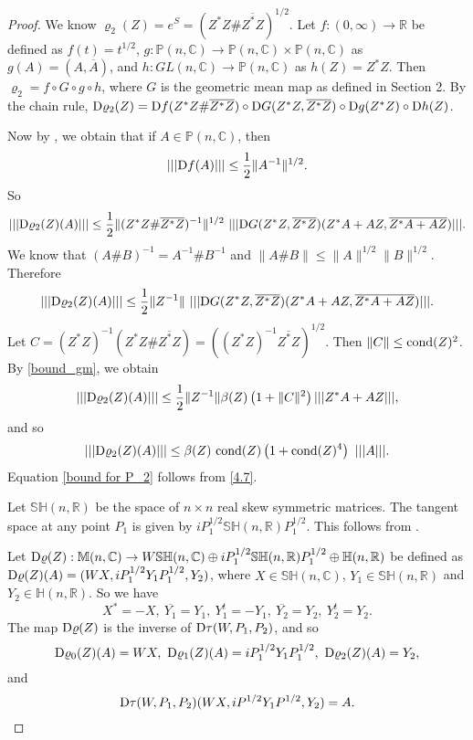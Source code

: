 \documentclass[12pt,epsfig,reqno]{amsart}
\newcommand{\C}{\mathbb{C}}
\newcommand{\R}{\mathbb{R}}
\newcommand{\De}{{\rm D}}
\theoremstyle{remark}
\begin{document}
\begin{proof}


We know $\varrho_2(Z)=e^S=(Z^*Z\# \overline{Z^*Z})^{1/2}$.
Let $f:(0,\infty)\rightarrow \mathbb R$ be defined as $f (t)=t^{1/2}$, $g:\mathbb P(n,\mathbb C)\rightarrow \mathbb P(n,\mathbb C)\times \mathbb P(n,\mathbb C)$ as $g(A)=(A,\overline{A})$, and $h:GL(n,\mathbb C)\rightarrow \mathbb P(n,\mathbb C)$ as $h(Z)=Z^*Z$. Then $\varrho_2=f\circ G \circ g \circ h$, where $G$ is the geometric mean map as defined in Section 2. By the chain rule, $\De \varrho_2(Z)=\De f(Z^*Z\#\overline{Z^*Z})\circ \De G(Z^*Z, \overline{Z^*Z})\circ \De g(Z^*Z)\circ \De h(Z)$.

Now by \cite[Theorem X.3.1]{bhatia_matrix_analysis}, we obtain that if $A\in \mathbb P(n,\mathbb C)$, then
\begin{equation}
|||\De f(A)|||\leq \frac{1}{2}\|A^{-1}\|^{1/2}.\label{6.5}
\end{equation}
So
 $$|||\De \varrho_2(Z)(A)|||\leq \frac{1}{2}\|(Z^*Z\#\overline{Z^*Z})^{-1}\|^{1/2}\ |||\De G(Z^*Z, \overline{Z^*Z})(Z^*A+AZ, \overline{Z^*A+AZ})|||.$$
We know that $(A\#B)^{-1}=A^{-1}\# B^{-1}$ and $\|A\#B\|\leq \|A\|^{1/2} \|B\|^{1/2}$. Therefore
$$|||\De \varrho_2(Z)(A)|||\leq \frac{1}{2}\|Z^{-1}\|\ |||\De G(Z^*Z, \overline{Z^*Z})(Z^*A+AZ, \overline{Z^*A+AZ})|||.$$
Let $C=(Z^*Z)^{-1} \left(Z^*Z\#\overline{Z^*Z}\right)=\left((Z^*Z)^{-1}\overline{Z^*Z}\right)^{1/2}$. Then $\|C\|\leq \text{\rm cond} (Z)^2$. By \eqref{bound_gm}, we obtain
\begin{equation}
|||\De \varrho_2(Z)(A)|||\leq \frac{1}{2}\|Z^{-1}\| \beta(Z)
\left(1+\|C\|^2\right)|||Z^*A+AZ|||,\label{6.7}
\end{equation}
and so
\begin{equation}
|||\De \varrho_2(Z)(A)|||\leq  \beta(Z)\
\text{\rm cond} (Z)  \left(1+\text{\rm cond}(Z)^4\right)\ |||A|||.\label{4.7}
\end{equation}
Equation \eqref{bound for P_2} follows from \eqref{4.7}.

Let $\mathbb {SH}(n,\R)$ be the space of $n\times n$ real skew symmetric matrices. The tangent space at any point $P_1$ is given by $i P_1^{1/2} \mathbb {SH}(n,\R)P_1^{1/2}$. This follows from \cite[p. 258]{bhatia_Matrix_factorizations}.

Let
$ \De\varrho(Z): \mathbb{M}(n,\C)\to W\mathbb {SH}(n,\C)\oplus i P_1^{1/2} \mathbb {SH}(n,\R)P_1^{1/2}\oplus \mathbb H(n,\R)$ be defined as
$\De \varrho(Z)(A)=(W X, i P_1^{1/2} Y_1 P_1^{1/2}, Y_2)$, where $X\in \mathbb {SH}(n,\C)$, $Y_1\in \mathbb {SH}(n,\R)$ and $Y_2\in  \mathbb H(n,\R)$. So we have \begin{equation}X^*=-X,\ \overline{Y_1}=Y_1,\ Y_1^t=-Y_1,\ \overline{Y_2}=Y_2,\ Y_2^t=Y_2.\label{6.7}\end{equation}  The map $\De \varrho(Z)$ is the inverse of $\De \tau(W, P_1, P_2)$, and so
\begin{equation}
\De \varrho_0(Z)(A)=W X,\ \De \varrho_1(Z)(A)=i P_1^{1/2} Y_1 P_1^{1/2},\ \De \varrho_2(Z)(A)=Y_2,\label{eq3.9}
\end{equation}
and \begin{equation}
 \De \tau(W, P_1, P_2)(W X, i P^{1/2} Y_1 P^{1/2}, Y_2)=A.\label{6.8}
\end{equation}


\end{proof}
\end{document}
